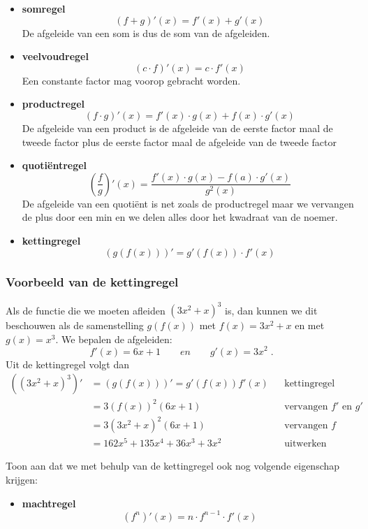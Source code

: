 \documentclass[12pt]{article}
\newenvironment{kader}
{
  \begin{mdframed}[nobreak=true]
  }{%
  \end{mdframed}
}
\begin{document}
\begin{kader}
  \begin{itemize}
  \item {\bf somregel}
    $$(f+g)'(x)=f'(x)+g'(x)$$
    De afgeleide van een som is dus de som van de afgeleiden.
  \item {\bf veelvoudregel}
    $$(c\cdot f)'(x) = c\cdot f'(x)$$
    Een constante factor mag voorop gebracht worden.
  \item {\bf productregel}
    $$(f\cdot g)'(x)=f'(x)\cdot g(x) + f(x)\cdot g'(x)$$
    De afgeleide van een product is de afgeleide van de eerste factor maal de tweede factor plus de eerste factor maal de afgeleide van de tweede factor
  \item {\bf quotiëntregel}
    $$\left(\dfrac{f}{g}\right)'(x)=\dfrac{f'(x)\cdot g(x)-f(a)\cdot g'(x)}{g^2(x)}$$
    De afgeleide van een quotiënt is net zoals de productregel maar we vervangen de plus door een min en we delen alles door het kwadraat van de noemer.
  \item {\bf kettingregel}
    $$\left(g\left(f\left(x\right)\right)\right)'=g'(f(x))\cdot f'(x)$$
  \end{itemize}
\end{kader}

\subsubsection*{Voorbeeld van de kettingregel}

Als de functie die we moeten afleiden $(3x^2+x)^3$ is, dan kunnen we dit beschouwen als de samenstelling $g(f(x))$ met $f(x)=3x^2+x$ en met $g(x)=x^3$. We bepalen de afgeleiden:
$$f'(x)=6x+1 \qquad en \qquad g'(x)=3x^2\;.$$
Uit de kettingregel volgt dan
\begin{align*}
  \left((3x^2+x)^3\right)' & =\left(g\left(f\left(x\right)\right)\right)' =g'(f(x)) f'(x) &&\mbox{kettingregel}\\
                           & =3(f(x))^2 (6x+1) &&\mbox{vervangen $f'$ en $g'$}\\
                           & = 3(3x^2+x)^2(6x+1) &&\mbox{vervangen $f$}\\
                           & = 162x^5 + 135x^4 + 36x^3 + 3x^2 &&\mbox{uitwerken}
\end{align*}

\begin{oefening}
  Toon aan dat we met behulp van de kettingregel ook nog volgende eigenschap krijgen:
  \begin{kader}
    \begin{itemize}
    \item {\bf machtregel}
      $$(f^n)'(x)=n\cdot f^{n-1} \cdot f'(x)$$
    \end{itemize}
  \end{kader}
\end{oefening}
\end{document}

